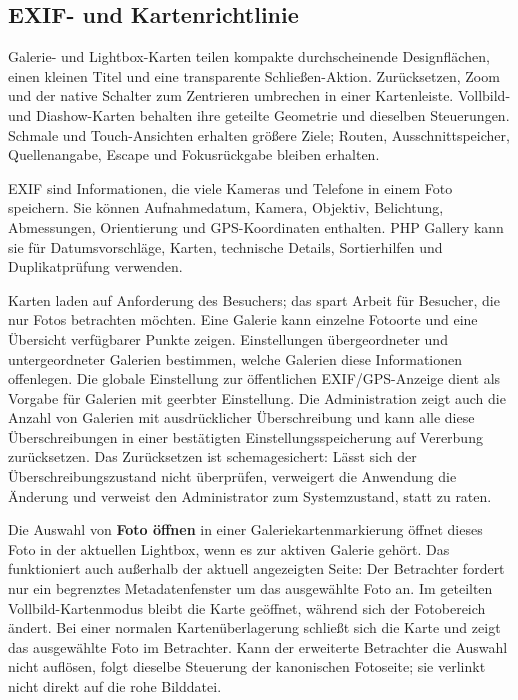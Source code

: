 \documentclass[11pt,a4paper]{article}
\newcommand{\ui}[1]{\textbf{#1}}
\begin{document}
\subsection{EXIF- und Kartenrichtlinie}

Galerie- und Lightbox-Karten teilen kompakte durchscheinende Designflächen,
einen kleinen Titel und eine transparente Schließen-Aktion. Zurücksetzen,
Zoom und der native Schalter zum Zentrieren umbrechen in einer Kartenleiste.
Vollbild- und Diashow-Karten behalten ihre geteilte Geometrie und dieselben
Steuerungen. Schmale und Touch-Ansichten erhalten größere Ziele; Routen,
Ausschnittspeicher, Quellenangabe, Escape und Fokusrückgabe bleiben erhalten.

EXIF sind Informationen, die viele Kameras und Telefone in einem Foto speichern.
Sie können Aufnahmedatum, Kamera, Objektiv, Belichtung, Abmessungen,
Orientierung und GPS-Koordinaten enthalten. PHP Gallery kann sie für
Datumsvorschläge, Karten, technische Details, Sortierhilfen und Duplikatprüfung
verwenden.

Karten laden auf Anforderung des Besuchers; das spart Arbeit für Besucher, die
nur Fotos betrachten möchten. Eine Galerie kann einzelne Fotoorte und eine
Übersicht verfügbarer Punkte zeigen. Einstellungen übergeordneter und
untergeordneter Galerien bestimmen, welche Galerien diese Informationen
offenlegen. Die globale Einstellung zur öffentlichen EXIF/GPS-Anzeige dient als
Vorgabe für Galerien mit geerbter Einstellung. Die Administration zeigt auch die
Anzahl von Galerien mit ausdrücklicher Überschreibung und kann alle diese
Überschreibungen in einer bestätigten Einstellungsspeicherung auf Vererbung
zurücksetzen. Das Zurücksetzen ist schemagesichert: Lässt sich der
Überschreibungszustand nicht überprüfen, verweigert die Anwendung die Änderung
und verweist den Administrator zum Systemzustand, statt zu raten.

Die Auswahl von \ui{Foto öffnen} in einer Galeriekartenmarkierung öffnet dieses
Foto in der aktuellen Lightbox, wenn es zur aktiven Galerie gehört. Das
funktioniert auch außerhalb der aktuell angezeigten Seite: Der Betrachter
fordert nur ein begrenztes Metadatenfenster um das ausgewählte Foto an. Im
geteilten Vollbild-Kartenmodus bleibt die Karte geöffnet, während sich der
Fotobereich ändert. Bei einer normalen Kartenüberlagerung schließt sich die
Karte und zeigt das ausgewählte Foto im Betrachter. Kann der erweiterte
Betrachter die Auswahl nicht auflösen, folgt dieselbe Steuerung der kanonischen
Fotoseite; sie verlinkt nicht direkt auf die rohe Bilddatei.
\end{document}
